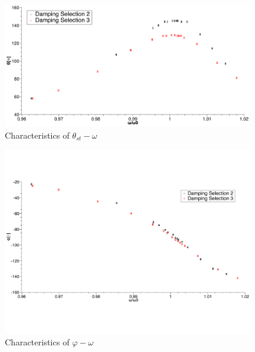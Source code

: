 \documentclass[a4paper,12pt]{article}
\begin{document}
\newpage
\begin{figure}[h] 
    \centering
    \includegraphics[width=0.96\textwidth]{Figx1_1} 
    \caption{Characteristics of $\theta_{st}-\omega$} 
\end{figure}

\begin{figure}[h] 
    \centering
    \includegraphics[width=0.96\textwidth]{Figx2_3} 
    \caption{Characteristics of $\varphi-\omega~$} 
\end{figure}

\newpage
\end{document}
